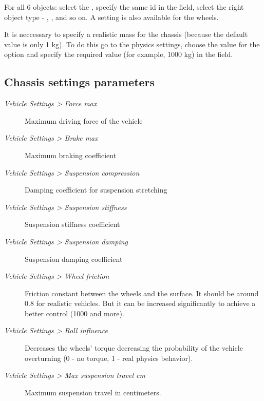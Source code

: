 \documentclass[a4paper,12pt,oneside]{sphinxmanual}
\begin{document}
\begin{DUlineblock}{0em}
\item[] 
\end{DUlineblock}

For all 6 objects: select the , specify the same id in the  field, select the right object type - , ,  and so on. A  setting is also available for the wheels.

It is neccessary to specify a realistic mass for the chassis (because the default value is only 1 kg). To do this go to the physics settings, choose the  value for the  option and specify the required value (for example, 1000 kg) in the  field.


\subsection{Chassis settings parameters}
\label{physics:id6}\begin{description}
\item[{\emph{Vehicle Settings \textgreater{} Force max}}] \leavevmode
Maximum driving force of the vehicle

\item[{\emph{Vehicle Settings \textgreater{} Brake max}}] \leavevmode
Maximum braking coefficient

\item[{\emph{Vehicle Settings \textgreater{} Suspension compression}}] \leavevmode
Damping coefficient for suspension stretching

\item[{\emph{Vehicle Settings \textgreater{} Suspension stiffness}}] \leavevmode
Suspension stiffness coefficient

\item[{\emph{Vehicle Settings \textgreater{} Suspension damping}}] \leavevmode
Suspension damping coefficient

\item[{\emph{Vehicle Settings \textgreater{} Wheel friction}}] \leavevmode
Friction constant between the wheels and the surface. It should be around 0.8 for realistic vehicles. But it can be increased significantly to achieve a better control (1000 and more).

\item[{\emph{Vehicle Settings \textgreater{} Roll influence}}] \leavevmode
Decreases the wheels' torque decreasing the probability of the vehicle overturning (0 - no torque, 1 - real physics behavior).

\item[{\emph{Vehicle Settings \textgreater{} Max suspension travel cm}}] \leavevmode
Maximum suspension travel in centimeters.

\end{description}
\end{document}
